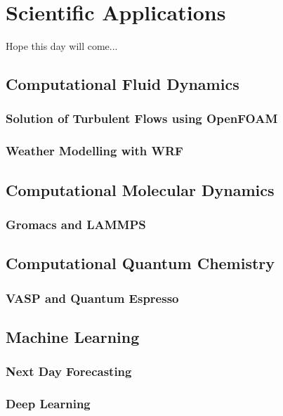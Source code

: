 \chapter{Scientific Applications}
Hope this day will come...

\section{Computational Fluid Dynamics}
\subsection{Solution of Turbulent Flows using OpenFOAM}
\subsection{Weather Modelling with WRF}

\section{Computational Molecular Dynamics}
\subsection{Gromacs and LAMMPS}

\section{Computational Quantum Chemistry}
\subsection{VASP and Quantum Espresso}

\section{Machine Learning}
\subsection{Next Day Forecasting}
\subsection{Deep Learning}
